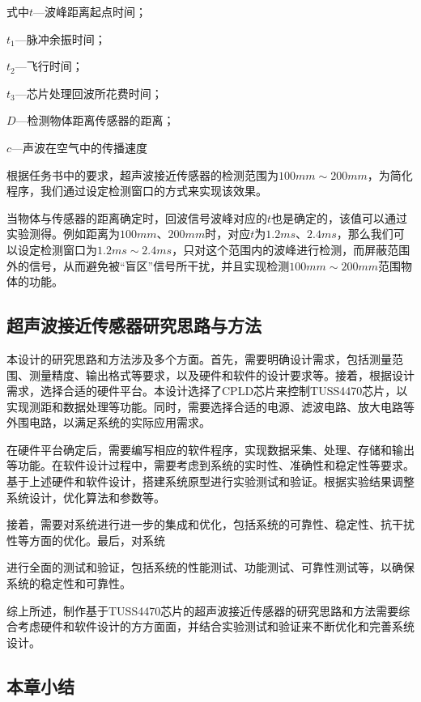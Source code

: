 式中\quad$t$---波峰距离起点时间；\par
    \quad$t_1$---脉冲余振时间；\par
    \quad$t_2$---飞行时间；\par    
    \quad$t_3$---芯片处理回波所花费时间；\par 
    \quad$D$---检测物体距离传感器的距离；\par  
    \quad$c$---声波在空气中的传播速度\par    
    根据任务书中的要求，超声波接近传感器的检测范围为$100mm\sim200mm$，为简化程序，我们通过设定检测窗口的方式来实现该效果。\par  
    当物体与传感器的距离确定时，回波信号波峰对应的$t$也是确定的，该值可以通过实验测得。例如距离为$100mm$、$200mm$时，对应$t$为$1.2ms$、$2.4ms$，那么我们可以设定检测窗口为$1.2ms\sim2.4ms$，只对这个范围内的波峰进行检测，而屏蔽范围外的信号，从而避免被“盲区”信号所干扰，并且实现检测$100mm\sim200mm$范围物体的功能。\par
    
    
    \subsection{超声波接近传感器研究思路与方法}
    本设计的研究思路和方法涉及多个方面。首先，需要明确设计需求，包括测量范围、测量精度、输出格式等要求，以及硬件和软件的设计要求等。接着，根据设计需求，选择合适的硬件平台。本设计选择了CPLD芯片来控制TUSS4470芯片，以实现测距和数据处理等功能。同时，需要选择合适的电源、滤波电路、放大电路等外围电路，以满足系统的实际应用需求。
    
    在硬件平台确定后，需要编写相应的软件程序，实现数据采集、处理、存储和输出等功能。在软件设计过程中，需要考虑到系统的实时性、准确性和稳定性等要求。基于上述硬件和软件设计，搭建系统原型进行实验测试和验证。根据实验结果调整系统设计，优化算法和参数等。
    
    接着，需要对系统进行进一步的集成和优化，包括系统的可靠性、稳定性、抗干扰性等方面的优化。最后，对系统
    
    
    进行全面的测试和验证，包括系统的性能测试、功能测试、可靠性测试等，以确保系统的稳定性和可靠性。
    
    综上所述，制作基于TUSS4470芯片的超声波接近传感器的研究思路和方法需要综合考虑硬件和软件设计的方方面面，并结合实验测试和验证来不断优化和完善系统设计。
    \subsection{本章小结}
    